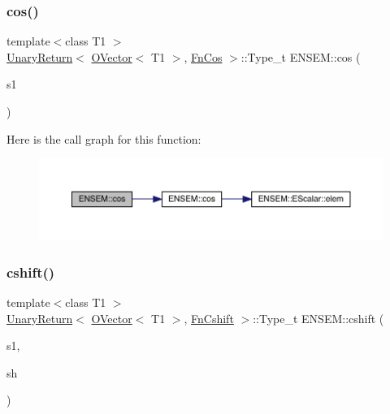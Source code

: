 \subsubsection{\texorpdfstring{cos()}{cos()}}
{\footnotesize\ttfamily template$<$class T1 $>$ \\
\mbox{\hyperlink{structENSEM_1_1UnaryReturn}{Unary\+Return}}$<$ \mbox{\hyperlink{classENSEM_1_1OVector}{O\+Vector}}$<$ T1 $>$, \mbox{\hyperlink{structENSEM_1_1FnCos}{Fn\+Cos}} $>$\+::Type\+\_\+t E\+N\+S\+E\+M\+::cos (\begin{DoxyParamCaption}\item[{const \mbox{\hyperlink{classENSEM_1_1OVector}{O\+Vector}}$<$ T1 $>$ \&}]{s1 }\end{DoxyParamCaption})\hspace{0.3cm}{\ttfamily [inline]}}

Here is the call graph for this function\+:\nopagebreak
\begin{figure}[H]
\begin{center}
\leavevmode
\includegraphics[width=350pt]{da/d59/group__obsvector_ga723a9a3fcfd45943398e215f7702a7a2_cgraph}
\end{center}
\end{figure}
\mbox{\label{group__obsvector_ga62bf87c2f25855df9774ccd89281b555}} 
\subsubsection{\texorpdfstring{cshift()}{cshift()}}
{\footnotesize\ttfamily template$<$class T1 $>$ \\
\mbox{\hyperlink{structENSEM_1_1UnaryReturn}{Unary\+Return}}$<$ \mbox{\hyperlink{classENSEM_1_1OVector}{O\+Vector}}$<$ T1 $>$, \mbox{\hyperlink{structENSEM_1_1FnCshift}{Fn\+Cshift}} $>$\+::Type\+\_\+t E\+N\+S\+E\+M\+::cshift (\begin{DoxyParamCaption}\item[{const \mbox{\hyperlink{classENSEM_1_1OVector}{O\+Vector}}$<$ T1 $>$ \&}]{s1,  }\item[{int}]{sh }\end{DoxyParamCaption})\hspace{0.3cm}{\ttfamily [inline]}}

